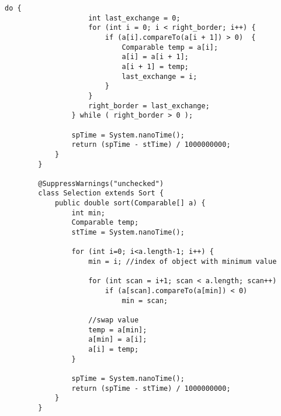 \begin{lstlisting}[caption=Sort.java]
				do {
					int last_exchange = 0;
					for (int i = 0; i < right_border; i++) {
						if (a[i].compareTo(a[i + 1]) > 0)  {
							Comparable temp = a[i];
							a[i] = a[i + 1];
							a[i + 1] = temp;
							last_exchange = i;
						}
					}
					right_border = last_exchange;
				} while ( right_border > 0 );
				
				spTime = System.nanoTime();
				return (spTime - stTime) / 1000000000;
			}
		}
		
		@SuppressWarnings("unchecked")
		class Selection extends Sort {
			public double sort(Comparable[] a) {
				int min;
				Comparable temp;
				stTime = System.nanoTime();
				
				for (int i=0; i<a.length-1; i++) {
					min = i; //index of object with minimum value
					
					for (int scan = i+1; scan < a.length; scan++)
						if (a[scan].compareTo(a[min]) < 0)
							min = scan;
					
					//swap value
					temp = a[min];
					a[min] = a[i];
					a[i] = temp;
				}
				
				spTime = System.nanoTime();
				return (spTime - stTime) / 1000000000;
			}
		}
	\end{lstlisting}

